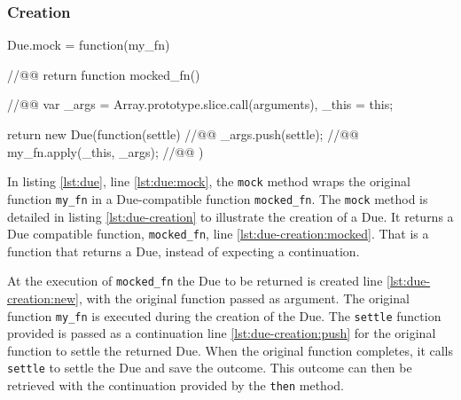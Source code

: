 \subsubsection{Creation} \label{chapter5:due:definition:creation}

\begin{code}[js, %
             caption={Creation of a due}, %
             label={lst:due-creation}] %
Due.mock = function(my_fn) { //@\label{lst:due-creation:mock}@
  return function mocked_fn() { //@\label{lst:due-creation:mocked}@
    var _args = Array.prototype.slice.call(arguments),
        _this = this;

    return new Due(function(settle) {  //@\label{lst:due-creation:new}@
      _args.push(settle);  //@\label{lst:due-creation:push}@
      my_fn.apply(_this, _args); //@\label{lst:due-creation:call}@
    })
  }
}
\end{code}


In listing \ref{lst:due}, line \ref{lst:due:mock}, the \texttt{mock} method wraps the original function \texttt{my\_fn} in a Due-compatible function \texttt{mocked\_fn}.
The \texttt{mock} method is detailed in listing \ref{lst:due-creation} to illustrate the creation of a Due.
It returns a Due compatible function, \texttt{mocked\_fn}, line \ref{lst:due-creation:mocked}.
That is a function that returns a Due, instead of expecting a continuation.

At the execution of \texttt{mocked\_fn} the Due to be returned is created line \ref{lst:due-creation:new}, with the original function passed as argument.
The original function \texttt{my\_fn} is executed during the creation of the Due.
The \texttt{settle} function provided is passed as a continuation line \ref{lst:due-creation:push} for the original function to settle the returned Due. %
When the original function completes, it calls \texttt{settle} to settle the Due and save the outcome.
This outcome can then be retrieved with the continuation provided by the \texttt{then} method.

